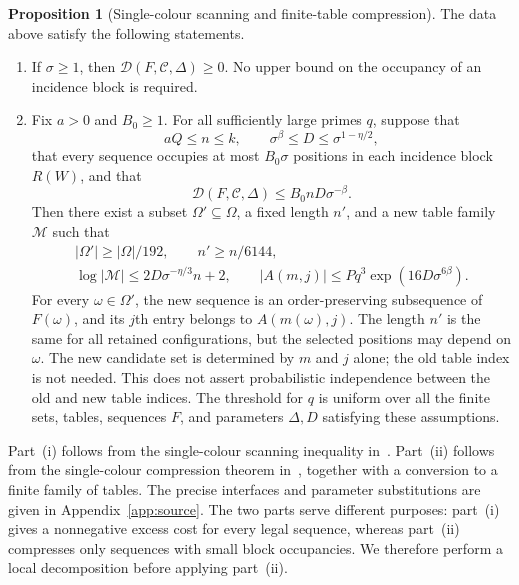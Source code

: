 \documentclass[11pt]{article}
\theoremstyle{definition}
\newtheorem{inputthm}[theorem]{Proposition}
\theoremstyle{remark}
\newcommand{\CC}{\mathcal C}
\newcommand{\DD}{\mathcal D}
\begin{document}
\begin{inputthm}[Single-colour scanning and finite-table compression]
\label{input:one}
The data above satisfy the following statements.

\begin{enumerate}[label=\textup{(\roman*)},leftmargin=2em]
\item\label{item:nonnegative}
If $\sigma\ge1$, then $\DD(F,\CC,\Delta)\ge0$. No upper bound on the
occupancy of an incidence block is required.

\item\label{item:compression}
Fix $a>0$ and $B_0\ge1$. For all sufficiently large primes $q$, suppose
that
\[
 aQ\le n\le k,\qquad
 \sigma^\beta\le D\le\sigma^{1-\eta/2},
\]
that every sequence occupies at most $B_0\sigma$ positions in each
incidence block $R(W)$, and that
\begin{equation}\label{eq:input-budget}
 \DD(F,\CC,\Delta)\le B_0nD\sigma^{-\beta}.
\end{equation}
Then there exist a subset $\Omega'\subseteq\Omega$, a fixed length $n'$,
and a new table family $\mathcal M$ such that
\begin{equation}\label{eq:output}
 \begin{gathered}
 |\Omega'|\ge|\Omega|/192,\qquad n'\ge n/6144,\\
 \log|\mathcal M|\le2D\sigma^{-\eta/3}n+2,\qquad
 |A(m,j)|\le Pq^3\exp(16D\sigma^{6\beta}).
 \end{gathered}
\end{equation}
For every $\omega\in\Omega'$, the new sequence is an order-preserving
subsequence of $F(\omega)$, and its $j$th entry belongs to
$A(m(\omega),j)$. The length $n'$ is the same for all retained
configurations, but the selected positions may depend on $\omega$.
The new candidate set is determined by $m$ and $j$ alone; the old table
index is not needed. This does not assert probabilistic independence
between the old and new table indices. The threshold for $q$ is uniform
over all the finite sets, tables, sequences $F$, and parameters
$\Delta,D$ satisfying these assumptions.
\end{enumerate}
\end{inputthm}

Part~\textup{(i)} follows from the single-colour scanning inequality
in~\cite{OAI-scan}. Part~\textup{(ii)} follows from the single-colour
compression theorem in~\cite{OAI-step}, together with a conversion to
a finite family of tables. The precise interfaces and parameter
substitutions are given in Appendix~\ref{app:source}. The two parts
serve different purposes: part~\textup{(i)} gives a nonnegative excess
cost for every legal sequence, whereas part~\textup{(ii)} compresses
only sequences with small block occupancies. We therefore perform a
local decomposition before applying part~\textup{(ii)}.
\end{document}
